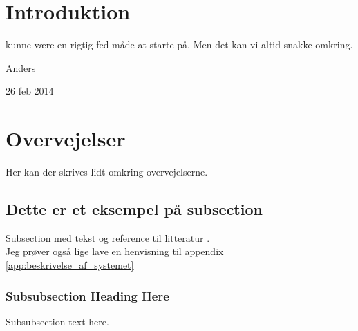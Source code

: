 \section{Introduktion}
\label{sec:introduction}

 kunne være en rigtig fed måde at starte på. Men det kan vi altid snakke omkring.

\hfill Anders
 
\hfill 26 feb 2014


\section{Overvejelser}
Her kan der skrives lidt omkring overvejelserne.

\subsection{Dette er et eksempel på subsection}
Subsection med tekst og reference til litteratur \citep{reflist}. \\

Jeg prøver også lige lave en henvisning til appendix \ref{app:beskrivelse_af_systemet}

\subsubsection{Subsubsection Heading Here}
Subsubsection text here.

